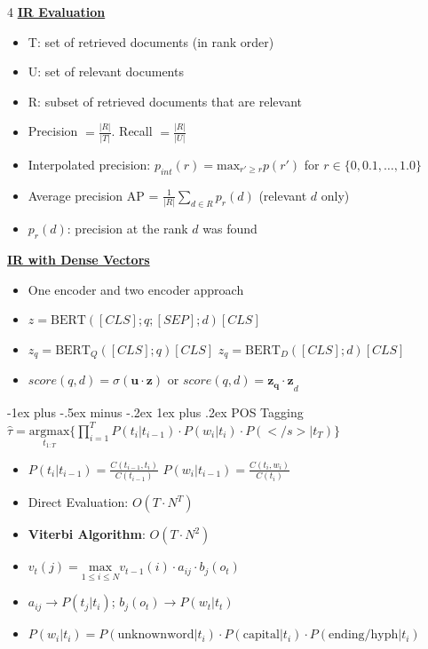 \documentclass[10pt, landscape]{article}
\makeatletter
\renewcommand{\subsubsection}{\@startsection{subsubsection}{3}{0mm}%
  {-1ex plus -.5ex minus -.2ex}%
  {1ex plus .2ex}%
{\normalfont\small\bfseries}}%
\makeatother
\begin{document}
\begin{multicols*}{4}
  \underline{\textbf{IR Evaluation}}
  \begin{itemize}
    \item T: set of retrieved documents (in rank order)
    \item U: set of relevant documents
    \item R: subset of retrieved documents that are relevant
    \item Precision $=\frac{|R|}{|T|}$. Recall $= \frac{|R|}{|U|}$
    \item Interpolated precision: $p_{int}(r) = \text{max}_{r' \geq r} p(r')$ for $ r \in \{0, 0.1, \dots, 1.0\} $
    \item Average precision AP = $\frac{1}{|R|} \sum_{d \in R} p_r(d)$ (relevant $d$ only)
    \item $p_r(d)$: precision at the rank $d$ was found
  \end{itemize}

  \underline{\textbf{IR with Dense Vectors}}
  \begin{itemize}
    \item One encoder and two encoder approach
    \item $z = \text{BERT}([CLS];q;[SEP];d)[CLS]$
    \item $z_q = \text{BERT}_Q([CLS];q)[CLS]$ $z_q = \text{BERT}_D([CLS];d)[CLS]$
    \item $score(q,d) = \sigma(\mathbf{u \cdot z})$ or $score(q,d) = \mathbf{z_q \cdot z}_d$
  \end{itemize}

  \subsubsection{POS Tagging}
   $\hat{\tau} = \underset{t_{1:T}}{\text{argmax}} \{ \prod_{i=1}^{T} P(t_i|t_{i-1}) \cdot P(w_i|t_i) \cdot P(</s>|t_T)\}$
  \begin{itemize}
    \item $P(t_i|t_{i-1}) = \frac{C(t_{i-1}, t_i)}{C(t_{i-1})}$ $P(w_i|t_{i-1}) = \frac{C(t_{i}, w_i)}{C(t_{i})}$
    \item Direct Evaluation: $O(T \cdot N^T)$
    \item \textbf{Viterbi Algorithm}: $O(T \cdot N^2)$
    \item $v_t(j) = \underset{1 \leq i \leq N}{\text{max}} v_{t-1}(i)\cdot a_{ij} \cdot b_j(o_t)$
    \item $a_{ij} \rightarrow P(t_j|t_i)$; $b_j(o_t) \rightarrow P(w_t | t_t)$
    \item $P(w_i|t_i) = P(\text{unknownword}|t_i) \cdot P(\text{capital}| t_i) \cdot P(\text{ending/hyph}|t_i)$
  \end{itemize}


\end{multicols*}
\end{document}
